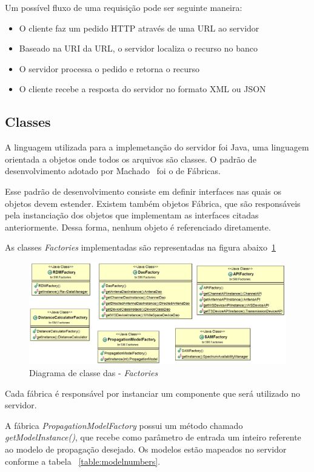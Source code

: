 Um possível fluxo de uma requisição pode ser seguinte maneira:

\begin{itemize}
\item O cliente faz um pedido HTTP através de uma URL ao servidor
\item Baseado na URI da URL, o servidor localiza o recurso no banco
\item O servidor processa o pedido e retorna o recurso
\item O cliente recebe a resposta do servidor no formato XML ou JSON
\end{itemize}


\subsection{Classes}
A linguagem utilizada para a implemetanção do servidor foi Java, uma linguagem orientada a objetos onde todos os arquivos são classes. O padrão de desenvolvimento adotado por Machado~\cite{tccmarcelo} foi o de Fábricas.

Esse padrão de desenvolvimento consiste em definir interfaces nas quais os objetos devem estender. Existem também objetos Fábrica, que são responsáveis pela instanciação dos objetos que implementam as interfaces citadas anteriormente. Dessa forma, nenhum objeto é referenciado diretamente.

As classes \textit{Factories} implementadas são representadas na figura abaixo~\ref{fig:facto}

\begin{figure}[htb]
\centering
\includegraphics[width=1.0\textwidth]{figs/factories}
\caption[\textit{Factories}.]
{Diagrama de classe das - \textit{Factories}~\cite{tccmarcelo} }
\label{fig:facto}
\end{figure} 


Cada fábrica é responsável por instanciar um componente que será utilizado no servidor. 

A fábrica \textit{PropagationModelFactory} possui um método chamado \textit{getModelInstance()}, que recebe como parâmetro de entrada um inteiro referente ao modelo de propagação desejado. Os modelos estão mapeados no servidor conforme a tabela ~\ref{table:modelnumbers}.


